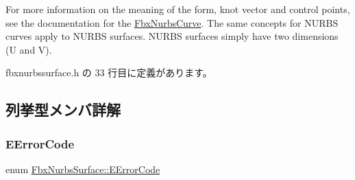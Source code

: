 For more information on the meaning of the form, knot vector and control points, see the documentation for the \hyperlink{class_fbx_nurbs_curve}{Fbx\+Nurbs\+Curve}. The same concepts for N\+U\+R\+BS curves apply to N\+U\+R\+BS surfaces. N\+U\+R\+BS surfaces simply have two dimensions (U and V). 

 fbxnurbssurface.\+h の 33 行目に定義があります。



\subsection{列挙型メンバ詳解}
\mbox{\label{class_fbx_nurbs_surface_adadf65d5c2d4ecb11d0d084c7312106a}} 
\subsubsection{\texorpdfstring{E\+Error\+Code}{EErrorCode}}
{\footnotesize\ttfamily enum \hyperlink{class_fbx_nurbs_surface_adadf65d5c2d4ecb11d0d084c7312106a}{Fbx\+Nurbs\+Surface\+::\+E\+Error\+Code}}

